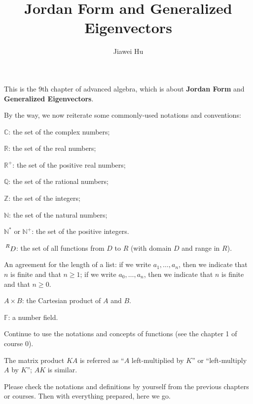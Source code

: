\documentclass{article}
\title{\LARGE \textbf{Jordan Form and Generalized Eigenvectors}}
\author{\large Jiawei Hu}
\begin{document}
\maketitle
\tableofcontents
\newpage

This is the 9th chapter of advanced algebra, which is about \textbf{Jordan Form} and \textbf{Generalized Eigenvectors}. 
 
By the way, we now reiterate some commonly-used notations and conventions:
\begin{compactenum}
    \item $\mathbb{C}$: the set of the complex numbers;
    \item $\mathbb{R}$: the set of the real numbers;
    \item $\mathbb{R}^+$: the set of the positive real numbers;
    \item $\mathbb{Q}$: the set of the rational numbers;
    \item $\mathbb{Z}$: the set of the integers;
    \item $\mathbb{N}$: the set of the natural numbers;
    \item $\mathbb{N^\ast}$ or $\mathbb{N}^+$: the set of the positive integers.
    \item $\sideset{^R}{}{\mathop{D}}$: the set of all functions from $D$ to $R$ (with domain $D$ and range in $R$).
    \item An agreement for the length of a list: if we write $a_1, \dots, a_n$, then we indicate that $n$ is finite and that $n\geq 1$; if we write $a_0, \dots, a_n$, then we indicate that $n$ is finite and that $n\geq 0$.
    \item $A\times B$: the Cartesian product of $A$ and $B$.
    \item $\mathbb{F}$: a number field.
    \item Continue to use the notations and concepts of functions (see the chapter 1 of course 0).
    \item The matrix product $KA$ is referred as ``$A$ left-multiplied by $K$'' or ``left-multiply $A$ by $K$''; $AK$ is similar.
\end{compactenum} 
Please check the notations and definitions by yourself from the previous chapters or courses. Then with everything prepared, here we go.
\end{document}
